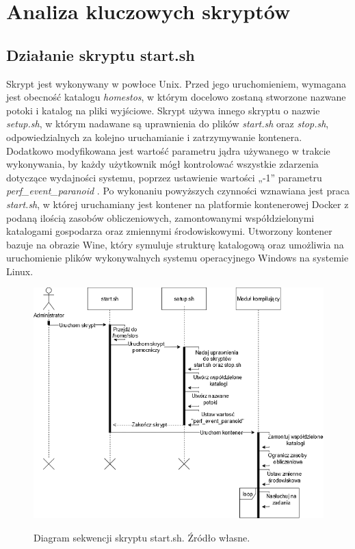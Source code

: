 \section{Analiza kluczowych skryptów}
\subsection{Działanie skryptu start.sh}
\indent Skrypt jest wykonywany w powłoce Unix. Przed jego uruchomieniem, wymagana jest obecność katalogu \textit{\/home\/stos}, w którym docelowo zostaną stworzone nazwane potoki i katalog na pliki wyjściowe. Skrypt używa innego skryptu o nazwie \textit{setup.sh}, w którym nadawane są uprawnienia do plików \textit{start.sh} oraz \textit{stop.sh}, odpowiedzialnych za kolejno uruchamianie i zatrzymywanie kontenera. Dodatkowo modyfikowana jest wartość parametru jądra używanego w trakcie wykonywania, by każdy użytkownik mógł kontrolować wszystkie zdarzenia dotyczące wydajności systemu, poprzez ustawienie wartości „-1” parametru \textit{perf\_event\_paranoid} \cite{perf}. Po wykonaniu powyższych czynności wznawiana jest praca \textit{start.sh}, w której uruchamiany jest kontener na platformie kontenerowej Docker z podaną ilością zasobów obliczeniowych, zamontowanymi współdzielonymi katalogami gospodarza oraz zmiennymi środowiskowymi. Utworzony kontener bazuje na obrazie Wine, który symuluje strukturę katalogową oraz umożliwia na uruchomienie plików wykonywalnych systemu operacyjnego Windows na systemie Linux.
\begin{figure}[!h]
	\begin{center}
		\resizebox{1.0\textwidth}{!} {
			\includegraphics{img/2/start.png}
		}
		\caption[Diagram sekwenji skryptu start.sh]{Diagram sekwencji skryptu start.sh. Źródło własne.}
	\end{center}
\end{figure}

